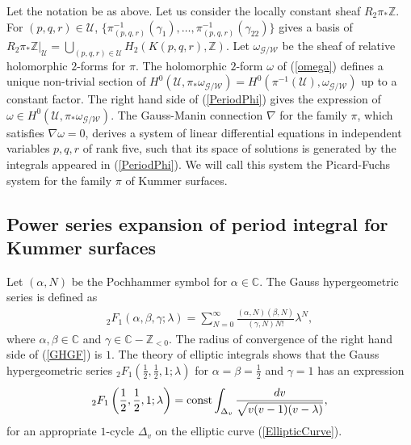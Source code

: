 \documentclass[10pt]{article}
\begin{document}
Let the notation be as above.
Let us consider the locally constant sheaf $R_2 \pi_* \mathbb{Z}$.
 For $(p,q,r) \in \mathcal{U}$,
$\{\pi^{-1}_{(p,q,r)} (\gamma_1),\ldots,\pi^{-1}_{(p,q,r)} (\gamma_{22})  \}$ gives a basis of 
$R_2 \pi_* \mathbb{Z} |_\mathcal{U} = \bigcup_{(p,q,r) \in \mathcal{U}} H_2 (K(p,q,r), \mathbb{Z})$.
Let $\omega_{\mathcal{G}/\mathcal{W}} $ be the sheaf of relative holomorphic $2$-forms for $\pi$.
The holomorphic $2$-form $\omega$ of (\ref{omega}) defines a unique non-trivial section of $H^0 (\mathcal{U}, \pi_* \omega_{\mathcal{G}/\mathcal{W}}) = H^0 (\pi^{-1} (\mathcal{U}), \omega_{\mathcal{G}/\mathcal{W}})$ up to a constant factor.
The right hand side of (\ref{PeriodPhi}) gives the expression of $\omega \in H^0 (\mathcal{U}, \pi_* \omega_{\mathcal{G}/\mathcal{W}})$.
The Gauss-Manin connection $\nabla$ for the family $\pi$, 
which satisfies $\nabla \omega =0$,
 derives a system of linear differential equations in independent variables $p,q,r$ of rank five,
 such that its space of solutions is generated by the integrals appeared in (\ref{PeriodPhi}).
 We will call this system the Picard-Fuchs system for the family $\pi$ of Kummer surfaces.


\subsection{Power series expansion of period integral for Kummer  surfaces}

Let $(\alpha,N)$ be the Pochhammer symbol for $\alpha\in \mathbb{C}$.
The Gauss hypergeometric series is defined as
\begin{align}\label{GHGF}
{}_2 F_1\left(\alpha,\beta,\gamma ; \lambda \right) =\sum_{N=0}^\infty \frac{(\alpha,N)(\beta,N)}{(\gamma,N) N!} \lambda^N,
\end{align}
where $\alpha,\beta\in \mathbb{C}$ and $\gamma\in \mathbb{C}-\mathbb{Z}_{<0}$.
The radius of convergence of the right hand side of (\ref{GHGF}) is $1$.
The theory of elliptic integrals shows that
the Gauss hypergeometric series 
${}_2 F_1\left(\frac{1}{2},\frac{1}{2},1 ; \lambda \right) $
 for $\alpha=\beta=\frac{1}{2}$ and $\gamma=1$
has an expression
\begin{align}\label{EllipticHG}
{}_2 F_1\left(\frac{1}{2},\frac{1}{2},1 ; \lambda\right)  = {\rm const} \int_{\Delta_{v}} \frac{dv}{\sqrt{v (v-1) (v-\lambda)}},
\end{align}
for an appropriate $1$-cycle $\Delta_v$ on the elliptic curve (\ref{EllipticCurve}). 
\end{document}
